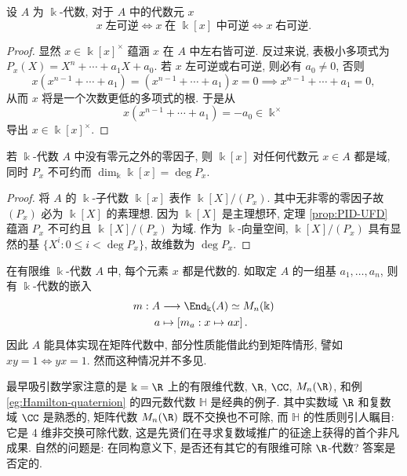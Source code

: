\begin{lemma}
	设 $A$ 为 $\Bbbk$-代数, 对于 $A$ 中的代数元 $x$
	\[ x\; \text{左可逆} \iff x\; \text{在 $\Bbbk[x]$ 中可逆} \iff x\; \text{右可逆}. \]
\end{lemma}
\begin{proof}
	显然 $x \in \Bbbk[x]^\times$ 蕴涵 $x$ 在 $A$ 中左右皆可逆. 反过来说, 表极小多项式为 $P_x(X) = X^n + \cdots + a_1 X + a_0$. 若 $x$ 左可逆或右可逆, 则必有 $a_0 \neq 0$, 否则
	\[ x(x^{n-1} + \cdots + a_1) = (x^{n-1} + \cdots + a_1)x = 0 \implies x^{n-1} + \cdots + a_1 = 0, \]
	从而 $x$ 将是一个次数更低的多项式的根. 于是从
	\[ x (x^{n-1} + \cdots + a_1) = -a_0 \in \Bbbk^\times \]
	导出 $x \in \Bbbk[x]^\times$.
\end{proof}

\begin{lemma}\label{prop:minimal-polynomial}
	若 $\Bbbk$-代数 $A$ 中没有零元之外的零因子, 则 $\Bbbk[x]$ 对任何代数元 $x \in A$ 都是域, 同时 $P_x$ 不可约而 $\dim_\Bbbk \Bbbk[x] = \deg P_x$.
\end{lemma}
\begin{proof}
	将 $A$ 的 $\Bbbk$-子代数 $\Bbbk[x]$ 表作 $\Bbbk[X]/(P_x)$. 其中无非零的零因子故 $(P_x)$ 必为 $\Bbbk[X]$ 的素理想. 因为 $\Bbbk[X]$ 是主理想环, 定理 \ref{prop:PID-UFD} 蕴涵 $P_x$ 不可约且 $\Bbbk[X]/(P_x)$ 为域. 作为 $\Bbbk$-向量空间, $\Bbbk[X]/(P_x)$ 具有显然的基 $\{X^i: 0 \leq i < \deg P_x \}$, 故维数为 $\deg P_x$.
\end{proof}

在有限维 $\Bbbk$-代数 $A$ 中, 每个元素 $x$ 都是代数的. 如取定 $A$ 的一组基 $a_1, \ldots, a_n$, 则有 $\Bbbk$-代数的嵌入
\begin{equation*}\begin{aligned}
	m: A & \longrightarrow \End_\Bbbk(A) \simeq M_n(\Bbbk) \\
	a & \mapsto \left[m_a: x \mapsto ax \right].
\end{aligned}\end{equation*}
因此 $A$ 能具体实现在矩阵代数中, 部分性质能借此约到矩阵情形, 譬如 $xy=1 \iff yx=1$. 然而这种情况并不多见.

最早吸引数学家注意的是 $\Bbbk=\R$ 上的有限维代数, $\R$, $\CC$, $M_n(\R)$, 和例 \ref{eg:Hamilton-quaternion} 的四元数代数 $\mathbb{H}$ 是经典的例子. 其中实数域 $\R$ 和复数域 $\CC$ 是熟悉的, 矩阵代数 $M_n(\R)$ 既不交换也不可除, 而 $\mathbb{H}$ 的性质则引人瞩目: 它是 4 维非交换可除代数, 这是先贤们在寻求复数域推广的征途上获得的首个非凡成果. 自然的问题是: 在同构意义下, 是否还有其它的有限维可除 $\R$-代数? 答案是否定的.

